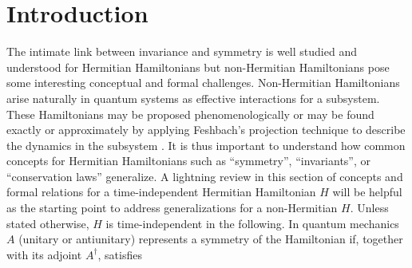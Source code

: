 \section{Introduction}
%
%
%
%
%
%
The intimate link between invariance and symmetry is well studied and understood
for
Hermitian Hamiltonians but non-Hermitian Hamiltonians pose some interesting
conceptual and formal challenges.
Non-Hermitian Hamiltonians arise naturally in quantum systems as effective interactions for a subsystem.
These Hamiltonians may be proposed phenomenologically or may be
found exactly or approximately by applying Feshbach's projection technique to describe the dynamics in
the subsystem \cite{Feshbach1958,Ruschhaupt2004a}.
It is thus  important to understand
how common concepts for Hermitian Hamiltonians such as ``symmetry'',
``invariants'', or ``conservation laws'' generalize.
A lightning review in this section of concepts and formal relations for a time-independent Hermitian Hamiltonian $H$ will
be helpful as the starting point to
address generalizations for a non-Hermitian $H$. Unless stated otherwise, $H$ is time-independent in the following.
In quantum mechanics $A$ (unitary or antiunitary) represents a symmetry of the Hamiltonian if, together with its adjoint $A^\dagger$,
satisfies
%

